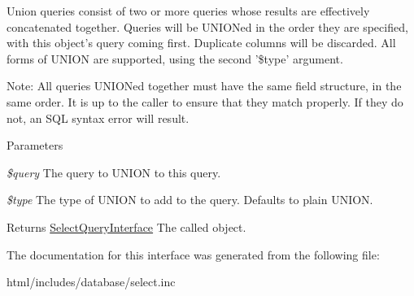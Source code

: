 Union queries consist of two or more queries whose results are effectively concatenated together. Queries will be UNIONed in the order they are specified, with this object's query coming first. Duplicate columns will be discarded. All forms of UNION are supported, using the second '\$type' argument.

Note: All queries UNIONed together must have the same field structure, in the same order. It is up to the caller to ensure that they match properly. If they do not, an SQL syntax error will result.


\begin{DoxyParams}{Parameters}
\item[{\em \$query}]The query to UNION to this query. \item[{\em \$type}]The type of UNION to add to the query. Defaults to plain UNION. \end{DoxyParams}
\begin{DoxyReturn}{Returns}
\hyperlink{interfaceSelectQueryInterface}{SelectQueryInterface} The called object. 
\end{DoxyReturn}


The documentation for this interface was generated from the following file:\begin{DoxyCompactItemize}
\item 
html/includes/database/select.inc\end{DoxyCompactItemize}
